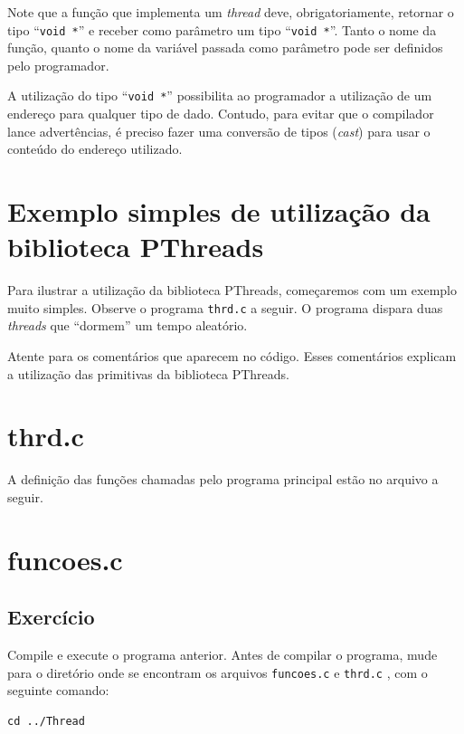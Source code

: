 Note que a função que implementa um \textit{thread} deve, obrigatoriamente, retornar o tipo \enquote{\mbox{\texttt{void *}}} e receber como parâmetro um tipo \enquote{\mbox{\texttt{void *}}}. Tanto o nome da função, quanto o nome da variável passada como parâmetro pode ser definidos pelo programador.

A utilização do tipo \enquote{\mbox{\texttt{void *}}} possibilita ao programador a utilização de um endereço para qualquer tipo de dado. Contudo, para evitar que o compilador lance advertências, é preciso fazer uma conversão de tipos (\textit{cast}) para usar o conteúdo do endereço utilizado.

\section{Exemplo simples de utilização da biblioteca PThreads}
Para ilustrar a utilização da biblioteca PThreads, começaremos com um exemplo muito simples. Observe o programa \texttt{thrd.c} a seguir. O programa dispara duas \textit{threads} que \enquote{dormem} um tempo aleatório. 

Atente para os comentários que aparecem no código. Esses comentários explicam a utilização das primitivas da biblioteca PThreads.

\section*{thrd.c}


A definição das funções chamadas pelo programa principal estão no arquivo a seguir.

\section*{funcoes.c}




\subsection{Exercício}
Compile e execute o programa anterior. Antes de compilar o programa, mude para o diretório onde se encontram os arquivos \texttt{funcoes.c} e \texttt{thrd.c} , com o seguinte comando:

\begin{lstlisting}[style=MyBashStyle]
cd ../Thread
\end{lstlisting}

